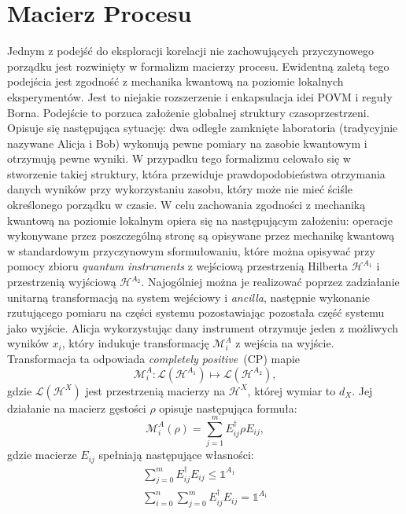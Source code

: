 \documentclass[10pt]{article} %
\newcommand{\Mats}[1]{\mathcal{L}(#1)}
\newcommand{\Hx}[1]{\mathcal{H}^{#1}}
\newcommand{\LHx}[1]{\Mats{\Hx{#1}}}
\newcommand{\MXi}[3]{\mathcal{M}^{#1}_{#2}(#3)}
\newcommand{\MAi}[1]{\MXi{A}{i}{#1}}
\newcommand{\Idx}[1]{\mathbb{1}^{#1}}
\newcommand{\CP}{\textit{completely positive}}
\begin{document}
\section{Macierz Procesu}
\label{macierz_procesu}
Jednym z podejść do eksploracji korelacji nie zachowujących przyczynowego porządku jest rozwinięty w \cite{process_matrix} formalizm macierzy procesu.
Ewidentną zaletą tego podejścia jest zgodność z mechanika kwantową na poziomie lokalnych eksperymentów. Jest to niejakie rozszerzenie i enkapsulacja idei POVM i reguły Borna. Podejście to porzuca założenie globalnej struktury czasoprzestrzeni. Opisuje się następująca sytuację: dwa odległe zamknięte laboratoria (tradycyjnie nazywane Alicja i Bob) wykonują pewne pomiary na zasobie kwantowym i otrzymują pewne wyniki. W przypadku tego formalizmu celowało się w stworzenie takiej struktury, która przewiduje prawdopodobieństwa otrzymania danych wyników przy wykorzystaniu zasobu, który może nie mieć ściśle określonego porządku w czasie. W celu zachowania zgodności z mechaniką kwantową na poziomie lokalnym opiera się na następującym założeniu: operacje wykonywane przez poszczególną stronę są opisywane przez mechanikę kwantową w standardowym przyczynowym sformułowaniu, które można opisywać przy pomocy zbioru \textit{quantum instruments} \cite{quantum_instrument} z wejściową przestrzenią Hilberta $\mathcal{H}^{A_1}$ i przestrzenią wyjściową  $\mathcal{H}^{A_2}$. Najogólniej można je realizować poprzez zadziałanie unitarną transformacją na system wejściowy i \textit{ancilla}, następnie wykonanie rzutującego pomiaru na części systemu pozostawiając pozostała część systemu jako wyjście. Alicja wykorzystując dany instrument otrzymuje jeden z możliwych wyników $x_i$, który indukuje transformację $\mathcal{M}^A_i$ z wejścia na wyjście. Transformacja ta odpowiada \CP~(CP) mapie
\begin{equation}
\mathcal{M}^A_i : \mathcal{L}(\mathcal{H}^{A_1}) \mapsto \mathcal{L}(\mathcal{H}^{A_2}),
\end{equation}
gdzie $\LHx{X}$ jest przestrzenią macierzy na $\Hx{X}$, której wymiar to $d_X$. Jej działanie na macierz gęstości $\rho$ opisuje następująca formuła:
\begin{equation}
\label{yolo}
\MAi{\rho} = \sum^m_{j=1} E_{ij} ^\dag \rho E_{ij},
\end{equation}
gdzie macierze $E_{ij}$ spełniają następujące własności:
\begin{gather}
\label{eq:id_proj0} 
\sum^m_{j=0} E_{ij}^\dag E_{ij} \leq \Idx{A_1} \\
\label{eq:id_proj} 
\sum^n_{i=0} \sum^m_{j=0} E_{ij}^\dag E_{ij} = \Idx{A_1}
\end{gather}
\end{document}
